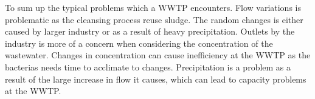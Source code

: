 




To sum up the typical problems which a WWTP encounters.
Flow variations is problematic as the cleansing process reuse sludge. 
The random changes is either caused by larger industry or as a result of heavy precipitation. Outlets by the industry is more of a concern when considering the concentration of the wastewater. Changes in concentration can cause inefficiency at the WWTP as the bacterias needs time to acclimate to changes. Precipitation is a problem as a result of the large increase in flow it causes, which can lead to capacity problems at the WWTP.  


